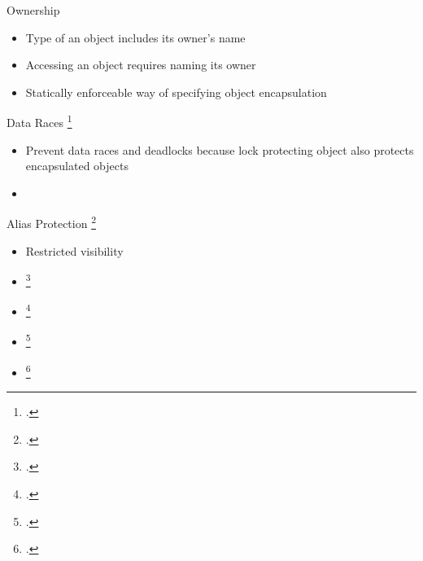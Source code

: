 \documentclass[aspectratio=169]{beamer}
\begin{document}
\begin{frame}{Ownership}
    \begin{itemize}
      \item Type of an object includes its owner's name
      \item Accessing an object requires naming its owner
      \item Statically enforceable way of specifying object encapsulation %
    \end{itemize}
\end{frame}

\begin{frame}
  Data Races \footcite{boyapati_ownership_2002}
    \begin{itemize}
        \item Prevent data races and deadlocks because lock protecting object also protects encapsulated objects
        \item {}
    \end{itemize}
  Alias Protection \footcite{clarke_ownership_1998}
    \begin{itemize}
        \item Restricted visibility 
    \end{itemize}
    \begin{itemize}
        \item \footcite{fahndrich_language_2006}
        \item \footcite{matsakis_rust_2014}
        \item \footcite{levy_ownership_2015}
        \item \footcite{jung_rustbelt:_2017}
    \end{itemize}
\end{frame}


\end{document}
